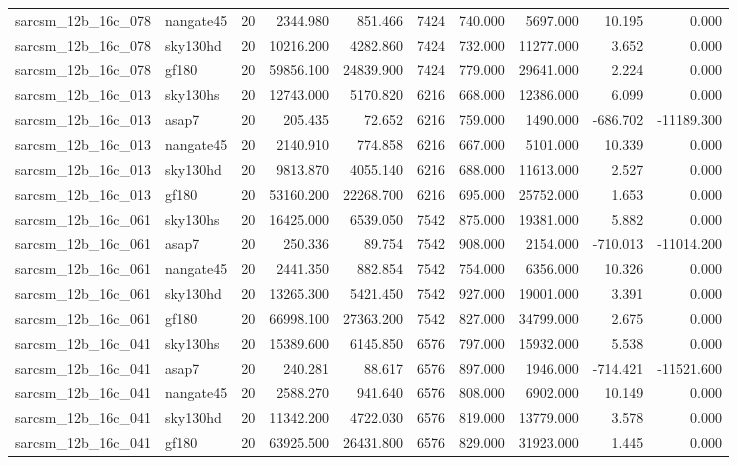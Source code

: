 \begin{tabular}{llrrrrrrrr}
sarcsm\_12b\_16c\_078 & nangate45 & 20 & 2344.980 & 851.466 & 7424 & 740.000 & 5697.000 & 10.195 & 0.000 \\
sarcsm\_12b\_16c\_078 & sky130hd & 20 & 10216.200 & 4282.860 & 7424 & 732.000 & 11277.000 & 3.652 & 0.000 \\
sarcsm\_12b\_16c\_078 & gf180 & 20 & 59856.100 & 24839.900 & 7424 & 779.000 & 29641.000 & 2.224 & 0.000 \\
sarcsm\_12b\_16c\_013 & sky130hs & 20 & 12743.000 & 5170.820 & 6216 & 668.000 & 12386.000 & 6.099 & 0.000 \\
sarcsm\_12b\_16c\_013 & asap7 & 20 & 205.435 & 72.652 & 6216 & 759.000 & 1490.000 & -686.702 & -11189.300 \\
sarcsm\_12b\_16c\_013 & nangate45 & 20 & 2140.910 & 774.858 & 6216 & 667.000 & 5101.000 & 10.339 & 0.000 \\
sarcsm\_12b\_16c\_013 & sky130hd & 20 & 9813.870 & 4055.140 & 6216 & 688.000 & 11613.000 & 2.527 & 0.000 \\
sarcsm\_12b\_16c\_013 & gf180 & 20 & 53160.200 & 22268.700 & 6216 & 695.000 & 25752.000 & 1.653 & 0.000 \\
sarcsm\_12b\_16c\_061 & sky130hs & 20 & 16425.000 & 6539.050 & 7542 & 875.000 & 19381.000 & 5.882 & 0.000 \\
sarcsm\_12b\_16c\_061 & asap7 & 20 & 250.336 & 89.754 & 7542 & 908.000 & 2154.000 & -710.013 & -11014.200 \\
sarcsm\_12b\_16c\_061 & nangate45 & 20 & 2441.350 & 882.854 & 7542 & 754.000 & 6356.000 & 10.326 & 0.000 \\
sarcsm\_12b\_16c\_061 & sky130hd & 20 & 13265.300 & 5421.450 & 7542 & 927.000 & 19001.000 & 3.391 & 0.000 \\
sarcsm\_12b\_16c\_061 & gf180 & 20 & 66998.100 & 27363.200 & 7542 & 827.000 & 34799.000 & 2.675 & 0.000 \\
sarcsm\_12b\_16c\_041 & sky130hs & 20 & 15389.600 & 6145.850 & 6576 & 797.000 & 15932.000 & 5.538 & 0.000 \\
sarcsm\_12b\_16c\_041 & asap7 & 20 & 240.281 & 88.617 & 6576 & 897.000 & 1946.000 & -714.421 & -11521.600 \\
sarcsm\_12b\_16c\_041 & nangate45 & 20 & 2588.270 & 941.640 & 6576 & 808.000 & 6902.000 & 10.149 & 0.000 \\
sarcsm\_12b\_16c\_041 & sky130hd & 20 & 11342.200 & 4722.030 & 6576 & 819.000 & 13779.000 & 3.578 & 0.000 \\
sarcsm\_12b\_16c\_041 & gf180 & 20 & 63925.500 & 26431.800 & 6576 & 829.000 & 31923.000 & 1.445 & 0.000 \\

\end{tabular}
